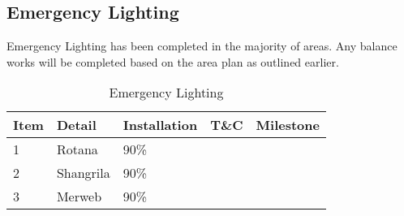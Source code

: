 \subsection{Emergency Lighting}
Emergency Lighting has been completed in the majority of areas. Any balance works
will be completed based on the area plan as outlined earlier.
\begin{table}[h]
{\RaggedRight
\begin{tabular}{lllll}
\toprule
Item &Detail &Installation &T\&C &Milestone\\
\midrule
1    & Rotana         & 90\%  & & \\
2    & Shangrila      & 90\% & &\\
3    & Merweb         & 90\% & &\\   
\bottomrule
\end{tabular}
\caption{Emergency Lighting}
}
\end{table}























